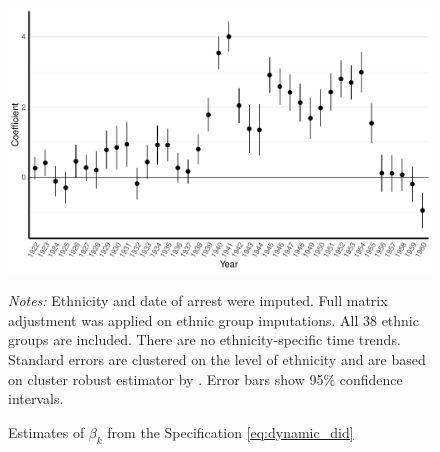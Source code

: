 

 \begin{figure}[h]
\centering
\caption{Estimates of $\beta_k$ from the Specification \ref{eq:dynamic_did}}
\includegraphics[width=\textwidth]{plots/final/fmla_pred_full_imp_date_no_trends_geopol_cr2.pdf}
\begin{minipage}{0.92\textwidth}
\footnotesize
\emph{Notes:} Ethnicity and date of arrest were imputed.  Full matrix adjustment was applied on ethnic group imputations. All 38 ethnic groups are included. 
There are no ethnicity-specific time trends. 
Standard errors are clustered on the level of ethnicity and are based on cluster robust estimator by \citet{pustejovsky_small-sample_2018}. Error bars show 95\% confidence intervals. 
\end{minipage}
\label{fig:did_effets}
\end{figure}

